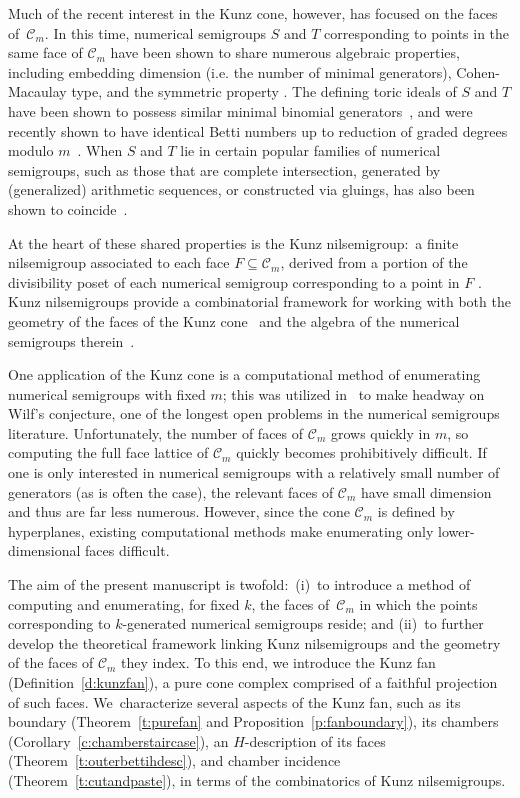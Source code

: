 \documentclass[ALCO, Unicode]{cedram}
\newcommand\cC{{\mathcal C}}
\begin{document}
Much of the recent interest in the Kunz cone, however, has focused on the faces of~$\cC_m$.  In this time, numerical semigroups $S$ and $T$ corresponding to points in the same face of $\cC_m$ have been shown to share numerous algebraic properties, including embedding dimension (i.e. the number of minimal generators), Cohen-Macaulay type, and the symmetric property \cite{wilfmultiplicity,kunzfaces1}.
The defining toric ideals of $S$ and $T$ have been shown to possess similar minimal binomial generators~\cite{kunzfaces3}, and were recently shown to have identical Betti numbers up to reduction of graded degrees modulo $m$~\cite{kunzfiniteres}.  When $S$ and $T$ lie in certain popular families of numerical semigroups, such as those that are complete intersection, generated by (generalized) arithmetic sequences, or constructed via gluings, has also been shown to coincide~\cite{kunzfaces2}.  

At the heart of these shared properties is the Kunz nilsemigroup:\ a finite nilsemigroup associated to each face $F \subseteq \cC_m$, derived from a portion of the divisibility poset of each numerical semigroup corresponding to a point in $F$ \cite{kunzfaces3,kunzfaces1}.  Kunz nilsemigroups provide a combinatorial framework for working with both the geometry of the faces of the Kunz cone~\cite{adventure5} and the algebra of the numerical semigroups therein~\cite{minprescard}.  

One application of the Kunz cone is a computational method of enumerating numerical semigroups with fixed $m$; this was utilized in~\cite{wilfmultiplicity} to make headway on Wilf's conjecture, one of the longest open problems in the numerical semigroups literature.  Unfortunately, the number of faces of $\cC_m$ grows quickly in $m$, so computing the full face lattice of $\cC_m$ quickly becomes prohibitively difficult.  If one is only interested in numerical semigroups with a relatively small number of generators (as is often the case), the relevant faces of $\cC_m$ have small dimension and thus are far less numerous.  However, since the cone $\cC_m$ is defined by hyperplanes, existing computational methods make enumerating only lower-dimensional faces difficult.  

The aim of the present manuscript is twofold:\ (i)~to introduce a method of computing and enumerating, for fixed $k$, the faces of~$\cC_m$ in which the points corresponding to $k$-generated numerical semigroups reside; and (ii)~to further develop the theoretical framework linking Kunz nilsemigroups and the geometry of the faces of $\cC_m$ they index.  
To this end, we introduce the Kunz fan (Definition~\ref{d:kunzfan}), a pure cone complex comprised of a faithful projection of such faces.  We~characterize several aspects of the Kunz fan, such as its boundary (Theorem~\ref{t:purefan} and Proposition~\ref{p:fanboundary}), its chambers (Corollary~\ref{c:chamberstaircase}), an $H$-description of its faces (Theorem~\ref{t:outerbettihdesc}), and chamber incidence (Theorem~\ref{t:cutandpaste}), in terms of the combinatorics of Kunz nilsemigroups.  
\end{document}
